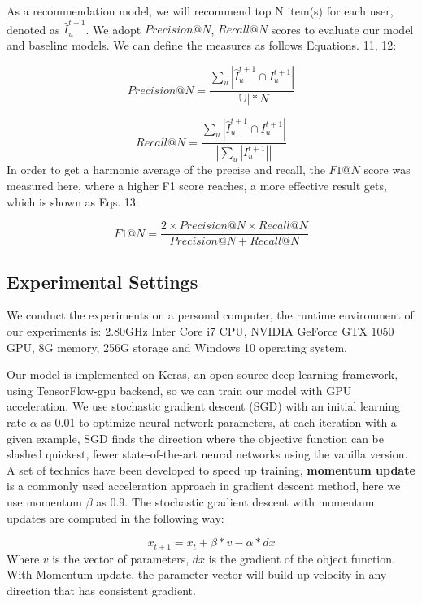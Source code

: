 \documentclass[runningheads]{llncs}
\begin{document}
As a recommendation model, we will recommend top N item(s) for each user, denoted as $\hat{I}_{u}^{t+1}$. We adopt $Precision@N$, $Recall@N$ scores to evaluate our model and baseline models. We can define the measures as follows Equations. 11, 12:

\begin{equation}
Precision@N=\frac{\sum_{u}|\hat{I}_{u}^{t+1}\cap I_{u}^{t+1} |}{\left | \mathbb{U} \right |*N}
\end{equation}

\begin{equation}
Recall@N=\frac{\sum_{u}|\hat{I}_{u}^{t+1}\cap I_{u}^{t+1} |}{\left |\sum_{u}|I_{u}^{t+1}| \right |}
\end{equation}
In order to get a harmonic average of the precise and recall, the $F1@N$ score was measured here, where a higher F1 score reaches, a more effective result gets, which is shown as Eqs. 13:

\begin{equation}
F1@N=\frac{2\times Precision@N\times Recall@N}{Precision@N+Recall@N}
\end{equation}
\subsection{Experimental Settings}

We conduct the experiments on a personal computer, the runtime environment of our experiments is: 2.80GHz Inter Core i7 CPU, NVIDIA GeForce GTX 1050 GPU, 8G memory, 256G storage and Windows 10 operating system.

Our model is implemented on Keras, an open-source deep learning framework, using TensorFlow-gpu backend, so we can train our model with GPU acceleration. We use stochastic gradient descent (SGD) \cite{22} with an initial learning rate $\alpha$ as 0.01 to optimize neural network parameters, at each iteration with a given example, SGD finds the direction where the objective function can be slashed quickest, fewer state-of-the-art neural networks using the vanilla version. A set of technics have been developed to speed up training, \textbf{momentum update} \cite{22} is a commonly used acceleration approach in gradient descent method, here we use momentum $\beta $ as 0.9. The stochastic gradient descent with momentum updates are computed in the following way:

\begin{equation}
x_{t+1} = x_{t} + \beta \ast v -\alpha \ast dx
\end{equation}
Where $v$ is the vector of parameters, $dx$ is the gradient of the object function. With Momentum update, the parameter vector will build up velocity in any direction that has consistent gradient.
\end{document}

